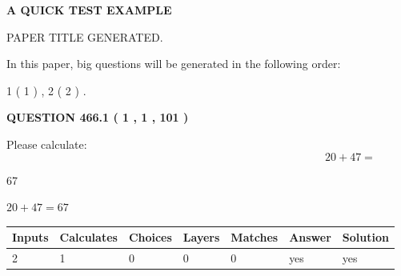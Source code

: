 \documentclass[12pt]{article}
\begin{document}
   
 \vspace{0.2in}
{\LARGE {\textbf{ A QUICK TEST EXAMPLE}}}
   
   
 PAPER TITLE GENERATED.
   
   
   
\vspace{0.2in}
   
In this paper, big questions will be generated in the following order: 
   
   
   1 ( 1 )
 ,
   2 ( 2 )
 .
  
\vspace{0.2in}
  
{\textbf{\Large{QUESTION
466.1 
 ( 1 , 1 , 101 )
}}}
  
  
 
Please calculate:
\begin{equation}
20 +  %
47 = \nonumber
\end{equation}
 
 
 
\noindent{}
 
 

67
 
 
\noindent{}
 
 

 
 
 
\noindent{}
 
 

$ %
20 +  %
47=   %
67$
 
 
\noindent{}
 
 

 
   
   
   
   
\noindent\begin{tabular}{|l|l|l|l|l|l|l|}
 \hline
Inputs & Calculates & Choices & Layers & Matches & Answer & Solution \\ \hline
 2  & 
 1  & 
 0
  & 
 0  & 
 0  & 
  yes & 
  yes 
  \\ \hline
 \end{tabular}
   
   
   
   
\noindent{}
   
\end{document}
